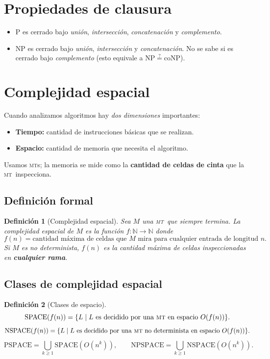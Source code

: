 \documentclass[11pt,a4paper]{article}
\theoremstyle{definicion}
\newtheorem{definicion}{Definici\'on}[section]
\newcommand{\MT}{\textsc{mt}}
\newcommand{\MTs}{\textsc{mt}s}
\newcommand{\N}{\mathbb{N}}
\newcommand{\NP}{\mathrm{NP}}
\newcommand{\Pclass}{\mathrm{P}}
\newcommand{\SPACE}{\mathrm{SPACE}}
\newcommand{\NSPACE}{\mathrm{NSPACE}}
\newcommand{\PSPACE}{\mathrm{PSPACE}}
\newcommand{\NPSPACE}{\mathrm{NPSPACE}}
\begin{document}
\section{Propiedades de clausura}

\begin{itemize}
    \item $\Pclass$ es cerrado bajo \emph{uni\'on}, \emph{intersecci\'on}, \emph{concatenaci\'on} y \emph{complemento}.
    \item $\NP$ es cerrado bajo \emph{uni\'on}, \emph{intersecci\'on} y \emph{concatenaci\'on}. No se sabe si es cerrado bajo \emph{complemento} (esto equivale a $\NP \overset{?}{=} \mathrm{coNP}$).
\end{itemize}

\section{Complejidad espacial}

Cuando analizamos algoritmos hay \emph{dos dimensiones} importantes:
\begin{itemize}
    \item \textbf{Tiempo:} cantidad de instrucciones b\'asicas que se realizan.
    \item \textbf{Espacio:} cantidad de memoria que necesita el algoritmo.
\end{itemize}
Usamos \MTs; la memoria se mide como la \textbf{cantidad de celdas de cinta} que la \MT\ inspecciona.

\subsection{Definici\'on formal}

\begin{definicion}[Complejidad espacial]
Sea $M$ una \MT\ que siempre termina. La complejidad espacial de $M$ es la funci\'on $f : \N \to \N$ donde
\[
f(n) = \text{cantidad m\'axima de celdas que } M \text{ mira para cualquier entrada de longitud } n.
\]
Si $M$ es no determinista, $f(n)$ es la cantidad m\'axima de celdas inspeccionadas en \textbf{cualquier rama}.
\end{definicion}

\subsection{Clases de complejidad espacial}

\begin{definicion}[Clases de espacio]
\[
\SPACE(f(n)) = \{ L \mid L \text{ es decidido por una \MT\ en espacio } O(f(n))\}.
\]
\[
\NSPACE(f(n)) = \{ L \mid L \text{ es decidido por una \MT\ no determinista en espacio } O(f(n))\}.
\]
\[
\PSPACE = \bigcup_{k \geq 1} \SPACE(O(n^k)), \qquad \NPSPACE = \bigcup_{k \geq 1} \NSPACE(O(n^k)).
\]
\end{definicion}
\end{document}

